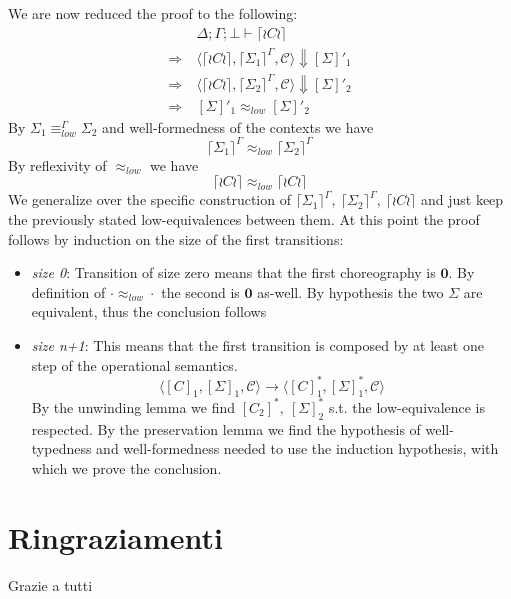 \documentclass[12pt,a4paper,twoside]{book}
\begin{document}
\medskip
\noindent We are now reduced the proof to the following:
\begin{align*}
	&\Delta;\Gamma;\bot \vdash \lceil \wr C \wr \rceil \\
	\Rightarrow\ &\langle \lceil \wr C \wr \rceil, \lceil \Sigma_1 \rceil^\Gamma, \mathscr{C}\rangle \Downarrow [\Sigma]'_1 \\
	\Rightarrow\ &\langle \lceil \wr C \wr \rceil, \lceil \Sigma_2 \rceil^\Gamma, \mathscr{C}\rangle \Downarrow [\Sigma]'_2 \\
	\Rightarrow\ &[\Sigma]'_1 \approx_{low} [\Sigma]'_2
\end{align*}
By $\Sigma_1 \equiv^\Gamma_{low} \Sigma_2$ and well-formedness of the contexts we have
$$
\lceil \Sigma_1 \rceil^\Gamma \approx_{low} \lceil \Sigma_2 \rceil^\Gamma
$$
By reflexivity of $\approx_{low}$ we have
$$
\lceil \wr C \wr \rceil \approx_{low} \lceil \wr C \wr \rceil
$$
We generalize over the specific construction of
$ \lceil \Sigma_1 \rceil^\Gamma,~\lceil \Sigma_2 \rceil^\Gamma,~\lceil \wr C \wr \rceil $ and just keep the previously stated low-equivalences between them.
At this point the proof follows by induction on the size of the first transitions:
\begin{itemize}
	\item \emph{size 0}: Transition of size zero means that the first choreography is $\boldsymbol{0}$. By definition of $\cdot \approx_{low} \cdot$ the second is $\boldsymbol{0}$ as-well. By hypothesis the two $\Sigma$ are equivalent, thus the conclusion follows
	\item \emph{size n+1}: This means that the first transition is composed by at least one step of the operational semantics.
$$
		\langle [C]_1, [\Sigma]_1, \mathscr{C}\rangle \rightarrow
		\langle [C]_1^*, [\Sigma]_1^*, \mathscr{C}\rangle
$$
		By the unwinding lemma we find $[C_2]^*,~[\Sigma]_2^*$ s.t. the low-equivalence is respected. By the preservation lemma we find the hypothesis of well-typedness and well-formedness needed to use the induction hypothesis, with which we prove the conclusion.
\end{itemize}





\chapter*{Ringraziamenti}
Grazie a tutti
\end{document}
